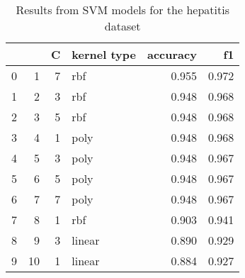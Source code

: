 \begin{table}
\centering
\caption{Results from SVM models for the hepatitis dataset}
\begin{tabular}{lrrlrr}
\toprule
 &  & C & kernel type & accuracy & f1 \\
\midrule
0 & 1 & 7 & rbf & 0.955 & 0.972 \\
1 & 2 & 3 & rbf & 0.948 & 0.968 \\
2 & 3 & 5 & rbf & 0.948 & 0.968 \\
3 & 4 & 1 & poly & 0.948 & 0.968 \\
4 & 5 & 3 & poly & 0.948 & 0.967 \\
5 & 6 & 5 & poly & 0.948 & 0.967 \\
6 & 7 & 7 & poly & 0.948 & 0.967 \\
7 & 8 & 1 & rbf & 0.903 & 0.941 \\
8 & 9 & 3 & linear & 0.890 & 0.929 \\
9 & 10 & 1 & linear & 0.884 & 0.927 \\
\bottomrule
\end{tabular}
\end{table}
